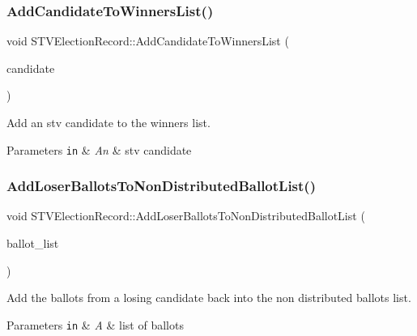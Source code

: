 \subsubsection{\texorpdfstring{Add\+Candidate\+To\+Winners\+List()}{AddCandidateToWinnersList()}}
{\footnotesize\ttfamily void S\+T\+V\+Election\+Record\+::\+Add\+Candidate\+To\+Winners\+List (\begin{DoxyParamCaption}\item[{\hyperlink{classSTVCandidate}{S\+T\+V\+Candidate} $\ast$}]{candidate }\end{DoxyParamCaption})}



Add an stv candidate to the winners list. 


\begin{DoxyParams}[1]{Parameters}
\mbox{\tt in}  & {\em An} & stv candidate \\
\hline
\end{DoxyParams}
\mbox{\label{classSTVElectionRecord_a04c1523f0e9f60e87544542fc39c56c4}} 
\subsubsection{\texorpdfstring{Add\+Loser\+Ballots\+To\+Non\+Distributed\+Ballot\+List()}{AddLoserBallotsToNonDistributedBallotList()}}
{\footnotesize\ttfamily void S\+T\+V\+Election\+Record\+::\+Add\+Loser\+Ballots\+To\+Non\+Distributed\+Ballot\+List (\begin{DoxyParamCaption}\item[{std\+::list$<$ \hyperlink{classBallot}{Ballot} $\ast$$>$}]{ballot\+\_\+list }\end{DoxyParamCaption})}



Add the ballots from a losing candidate back into the non distributed ballots list. 


\begin{DoxyParams}[1]{Parameters}
\mbox{\tt in}  & {\em A} & list of ballots \\
\hline
\end{DoxyParams}
\mbox{\label{classSTVElectionRecord_ab941d3821a34ef527128042500c416c7}} 
